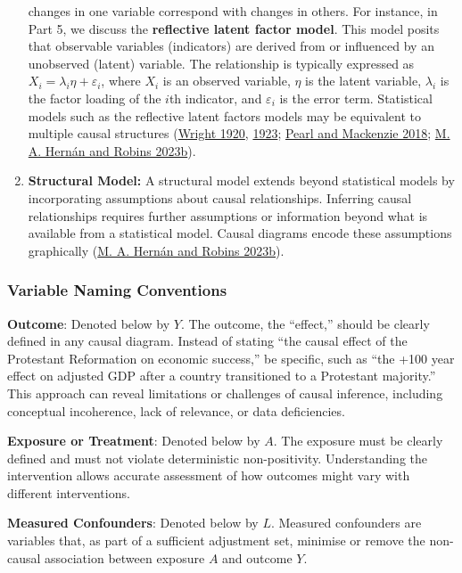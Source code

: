 \documentclass[
  singlecolumn]{report}
\begin{document}
\begin{enumerate}
  changes in one variable correspond with changes in others. For
  instance, in Part 5, we discuss the \textbf{reflective latent factor
  model}. This model posits that observable variables (indicators) are
  derived from or influenced by an unobserved (latent) variable. The
  relationship is typically expressed as
  \(X_i = \lambda_i \eta + \varepsilon_i\), where \(X_i\) is an observed
  variable, \(\eta\) is the latent variable, \(\lambda_i\) is the factor
  loading of the \(i\)th indicator, and \(\varepsilon_i\) is the error
  term. Statistical models such as the reflective latent factors models
  may be equivalent to multiple causal structures
  (\protect\hyperlink{ref-wright1920}{Wright 1920},
  \protect\hyperlink{ref-wright1923}{1923};
  \protect\hyperlink{ref-pearl2018}{Pearl and Mackenzie 2018};
  \protect\hyperlink{ref-hernuxe1n2023}{M. A. Hernán and Robins 2023b}).
\item
  \textbf{Structural Model:} A structural model extends beyond
  statistical models by incorporating assumptions about causal
  relationships. Inferring causal relationships requires further
  assumptions or information beyond what is available from a statistical
  model. Causal diagrams encode these assumptions graphically
  (\protect\hyperlink{ref-hernuxe1n2023}{M. A. Hernán and Robins
  2023b}).
\end{enumerate}

\hypertarget{variable-naming-conventions}{%
\subsubsection{Variable Naming
Conventions}\label{variable-naming-conventions}}

\textbf{Outcome}: Denoted below by \(Y\). The outcome, the ``effect,''
should be clearly defined in any causal diagram. Instead of stating
``the causal effect of the Protestant Reformation on economic success,''
be specific, such as ``the +100 year effect on adjusted GDP after a
country transitioned to a Protestant majority.'' This approach can
reveal limitations or challenges of causal inference, including
conceptual incoherence, lack of relevance, or data deficiencies.

\textbf{Exposure or Treatment}: Denoted below by \(A\). The exposure
must be clearly defined and must not violate deterministic
non-positivity. Understanding the intervention allows accurate
assessment of how outcomes might vary with different interventions.

\textbf{Measured Confounders}: Denoted below by \(L\). Measured
confounders are variables that, as part of a sufficient adjustment set,
minimise or remove the non-causal association between exposure \(A\) and
outcome \(Y\).
\end{document}
